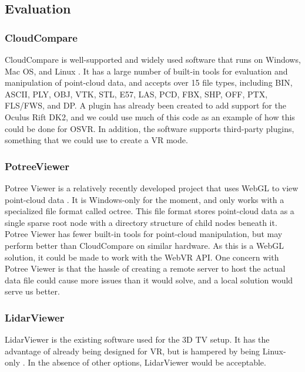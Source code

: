 \documentclass{article}
\begin{document}
\subsection{Evaluation}
\subsubsection{CloudCompare}
CloudCompare is well-supported and widely used software that runs on Windows, Mac OS, and Linux \cite{cloudcompare}.
It has a large number of built-in tools for evaluation and manipulation of point-cloud data, and accepts over 15 file types, including BIN, ASCII, PLY, OBJ, VTK, STL, E57, LAS, PCD, FBX, SHP, OFF, PTX, FLS/FWS, and DP. 
A plugin has already been created to add support for the Oculus Rift DK2, and we could use much of this code as an example of how this could be done for OSVR. 
In addition, the software supports third-party plugins, something that we could use to create a VR mode. 

\subsubsection{PotreeViewer}
Potree Viewer is a relatively recently developed project that uses WebGL to view point-cloud data \cite{potree}.
It is Windows-only for the moment, and only works with a specialized file format called octree. 
This file format stores point-cloud data as a single sparse root node with a directory structure of child nodes beneath it. 
Potree Viewer has fewer built-in tools for point-cloud manipulation, but may perform better than CloudCompare on similar hardware. 
As this is a WebGL solution, it could be made to work with the WebVR API.
One concern with Potree Viewer is that the hassle of creating a remote server to host the actual data file could cause more issues than it would solve, and a local solution would serve us better.

\subsubsection{LidarViewer}
LidarViewer is the existing software used for the 3D TV setup. It has the advantage of already being designed for VR, but is hampered by being Linux-only \cite{lidarviewer}.
In the absence of other options, LidarViewer would be acceptable.
\end{document}

